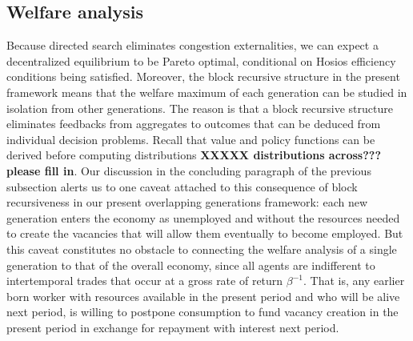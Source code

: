 \subsection{Welfare analysis}
Because directed search eliminates congestion externalities,
we can expect a
decentralized equilibrium to  be Pareto optimal, conditional
on  Hosios efficiency conditions being satisfied. Moreover,
 the  block recursive structure in the present
framework means that the welfare maximum of each generation can be
studied in isolation from other generations. The
reason is that a block recursive structure
eliminates  feedbacks from aggregates to outcomes that can be
deduced from individual decision problems.
Recall that value and policy functions can be derived
before computing distributions {\bf XXXXX distributions across??? please fill in}.
Our discussion in the concluding  paragraph of the previous subsection alerts us to 
one caveat attached to this consequence of block recursiveness in our  present
overlapping generations
framework: each new generation enters the economy as
unemployed and  without the resources needed to create the vacancies
that will allow them eventually to become employed. But this caveat  constitutes no
obstacle to connecting the welfare analysis of
a single generation to that of  the overall economy, since
all agents are  indifferent to intertemporal trades that occur
at a gross rate of return $\beta^{-1}$. That is, any earlier born
worker with resources available in the present period and who will
be alive next period, is willing to postpone consumption to
fund vacancy creation in the present period in exchange
for repayment with interest next period.

